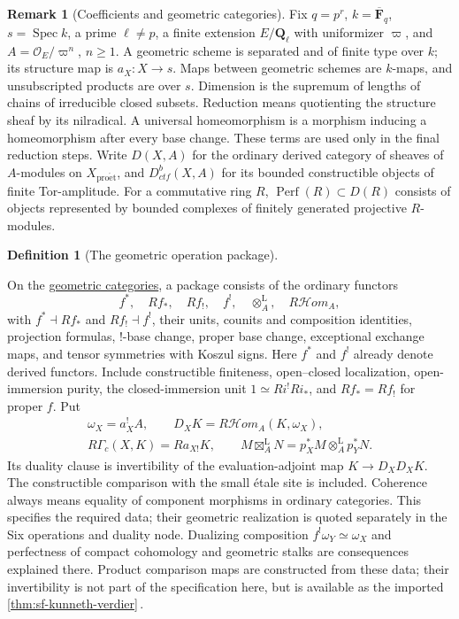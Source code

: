 \documentclass[11pt]{article}
\makeatletter
\theoremstyle{plain}
\theoremstyle{definition}
\newtheorem{definition}[theorem]{Definition}
\newtheorem{remark}[theorem]{Remark}
\newcommand{\up}[1]{%
  \ifcsname r@#1\endcsname
    \hyperref[#1]{\texttt{\scriptsize #1}}%
  \else
    \texttt{\scriptsize #1}%
  \fi}
\newcommand{\uses}[1]{\par\smallskip\noindent{\footnotesize\textit{Uses:}\ #1\par}\smallskip}
\newcommand{\Cref}[1]{\hyperref[#1]{\ref{#1}}\,\hyperref[#1]{\nameref*{#1}}}
\newcommand{\RHom}{R\mathcal Hom_A}
\newcommand{\Perf}{\operatorname{Perf}}
\newcommand{\boxt}{\boxtimes_A^{\mathrm L}}
\makeatother
\begin{document}
\begin{remark}[Coefficients and geometric categories]\label{d:setup}
Fix $q=p^r$, $k=\overline{\mathbf F}_q$, $s=\operatorname{Spec}k$, a prime
$\ell\ne p$, a finite extension $E/\mathbf Q_\ell$ with uniformizer $\varpi$,
and $A=\mathcal O_E/\varpi^n$, $n\ge1$.
A geometric scheme is separated and of finite type over $k$; its structure
map is $a_X:X\to s$. Maps between geometric schemes are $k$-maps, and
unsubscripted products are over $s$.
Dimension is the supremum of lengths of chains of irreducible closed
subsets. Reduction means quotienting the structure sheaf by its nilradical.
A universal homeomorphism is a morphism inducing a homeomorphism after
every base change. These terms are used only in the final reduction steps.
Write $D(X,A)$ for the ordinary derived category of sheaves of $A$-modules
on $X_{\mathrm{pro\acute et}}$, and $D^b_{ctf}(X,A)$ for its bounded
constructible objects of finite Tor-amplitude. For a commutative ring $R$,
$\Perf(R)\subset D(R)$ consists of objects represented by bounded complexes
of finitely generated projective $R$-modules.
\end{remark}

\begin{definition}[The geometric operation package]\label{d:six}
\uses{\up{d:setup}}
On the \hyperref[d:setup]{geometric categories}, a package consists of the
ordinary functors
\[
 f^*,\quad Rf_*,\quad Rf_!,\quad f^!,\quad\otimes_A^{\mathrm L},\quad\RHom,
\]
with $f^*\dashv Rf_*$ and $Rf_!\dashv f^!$, their units, counits and
composition identities, projection formulas, $!$-base change, proper base
change, exceptional exchange maps, and tensor symmetries with Koszul signs.
Here $f^*$ and $f^!$ already denote derived functors.
Include constructible finiteness, open--closed localization, open-immersion
purity, the closed-immersion unit $1\simeq Ri^!Ri_*$, and
$Rf_*=Rf_!$ for proper $f$. Put
\[
 \begin{gathered}
 \omega_X=a_X^!A,\qquad D_XK=\RHom(K,\omega_X),\\
 R\Gamma_c(X,K)=Ra_{X!}K,\qquad
 M\boxt N=p_X^*M\otimes_A^{\mathrm L}p_Y^*N.
 \end{gathered}
\]
Its duality clause is invertibility of the evaluation-adjoint map
$K\to D_XD_XK$.
The constructible comparison with the small \'etale site is included.
Coherence always means equality of component morphisms in ordinary categories.
This specifies the required data; their geometric realization is quoted
separately in the Six operations and duality node.
Dualizing composition $f^!\omega_Y\simeq\omega_X$ and perfectness of
compact cohomology and geometric stalks are consequences explained there.
Product comparison maps are constructed from these data; their invertibility
is not part of the specification here, but is available as the imported
\Cref{thm:sf-kunneth-verdier}.
\end{definition}
\end{document}
